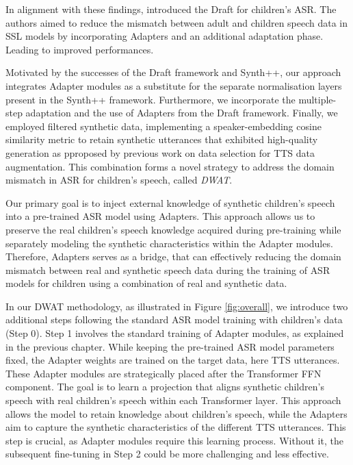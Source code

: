 In alignment with these findings, \cite{fan2022draft} introduced the \ac{Draft} for children's \ac{ASR}. The authors aimed to reduce the mismatch between adult and children speech data in SSL models by incorporating Adapters and an additional adaptation phase. Leading to improved performances.

Motivated by the successes of the \ac{Draft} framework and Synth++, our approach integrates Adapter modules as a substitute for the separate normalisation layers present in the Synth++ framework. Furthermore, we incorporate the multiple-step adaptation and the use of Adapters from the \ac{Draft} framework. Finally, we employed filtered synthetic data, implementing a speaker-embedding cosine similarity metric to retain synthetic utterances that exhibited high-quality generation as pproposed by previous work on data selection for \ac{TTS} data augmentation. This combination forms a novel strategy to address the domain mismatch in \ac{ASR} for children's speech, called \textit{\ac{DWAT}}. 


Our primary goal is to inject external knowledge of synthetic children's speech into a pre-trained \ac{ASR} model using Adapters. This approach allows us to preserve the real children's speech knowledge acquired during pre-training while separately modeling the synthetic characteristics within the Adapter modules. Therefore, Adapters serves as a bridge, that can effectively reducing the domain mismatch between real and synthetic speech data during the training of \ac{ASR} models for children using a combination of real and synthetic data. 

In our \ac{DWAT}  methodology, as illustrated in Figure \ref{fig:overall}, we introduce two additional steps following the standard \ac{ASR} model training with children's data (Step 0).
Step 1 involves the standard training of Adapter modules, as explained in the previous chapter. While keeping the pre-trained \ac{ASR} model parameters fixed, the Adapter weights are trained on the target data, here \ac{TTS} utterances. These Adapter modules are strategically placed after the Transformer \ac{FFN} component. The goal is to learn a projection that aligns synthetic children's speech with real children's speech within each Transformer layer. This approach allows the model to retain knowledge about children's speech, while the Adapters aim to capture the synthetic characteristics of the different \ac{TTS} utterances. This step is crucial, as Adapter modules require this learning process. Without it, the subsequent fine-tuning in Step 2 could be more challenging and less effective.

